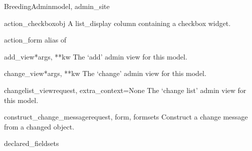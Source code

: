 \documentclass[letterpaper,10pt,english]{sphinxmanual}
\begin{document}
\hypertarget{animal.admin.BreedingAdmin}{}\begin{classdesc}{BreedingAdmin}{model, admin\_site}~

\hypertarget{animal.admin.BreedingAdmin.action_checkbox}{}\begin{methoddesc}{action\_checkbox}{obj}
A list\_display column containing a checkbox widget.
\end{methoddesc}

\hypertarget{animal.admin.BreedingAdmin.action_form}{}\begin{memberdesc}{action\_form}
alias of 
\end{memberdesc}

\hypertarget{animal.admin.BreedingAdmin.add_view}{}\begin{methoddesc}{add\_view}{*args, **kw}
The `add' admin view for this model.
\end{methoddesc}

\hypertarget{animal.admin.BreedingAdmin.change_view}{}\begin{methoddesc}{change\_view}{*args, **kw}
The `change' admin view for this model.
\end{methoddesc}

\hypertarget{animal.admin.BreedingAdmin.changelist_view}{}\begin{methoddesc}{changelist\_view}{request, extra\_context=None}
The `change list' admin view for this model.
\end{methoddesc}

\hypertarget{animal.admin.BreedingAdmin.construct_change_message}{}\begin{methoddesc}{construct\_change\_message}{request, form, formsets}
Construct a change message from a changed object.
\end{methoddesc}

\hypertarget{animal.admin.BreedingAdmin.declared_fieldsets}{}\begin{memberdesc}{declared\_fieldsets}\end{memberdesc}


\end{classdesc}
\end{document}
